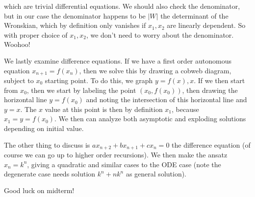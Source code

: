 \documentclass[10pt]{article}
\newcommand{\abs}[1]{\left|#1\right|}
\begin{document}
which are trivial differential equations. We should also check the denominator, but in our case the denominator happens to be $\abs{W}$ the determinant of the Wronskian, which by definition only vanishes if $x_1, x_2$ are linearly dependent. So with proper choice of $x_1, x_2$, we don't need to worry about the denominator. Woohoo!

We lastly examine difference equations. If we have a first order autonomous equation $x_{n+1} = f(x_n)$, then we solve this by drawing a cobweb diagram, subject to $x_0$ starting point. To do this, we graph $y=f(x),x$. If we then start from $x_0$, then we start by labeling the point $(x_0,f(x_0))$, then drawing the horizontal line $y=f(x_0)$ and noting the intersection of this horizontal line and $y=x$. The $x$ value at this point is then by definition $x_1$, because $x_1 = y = f(x_0)$. We then can analyze both asymptotic and exploding solutions depending on initial value. 

The other thing to discuss is $ax_{n+2} + bx_{n+1} + cx_n = 0$ the difference equation (of course we can go up to higher order recursions). We then make the ansatz $x_n = k^n$, giving a quadratic and similar cases to the ODE case (note the degenerate case needs solution $k^n + nk^n$ as general solution). 

Good luck on midterm!
\end{document}
